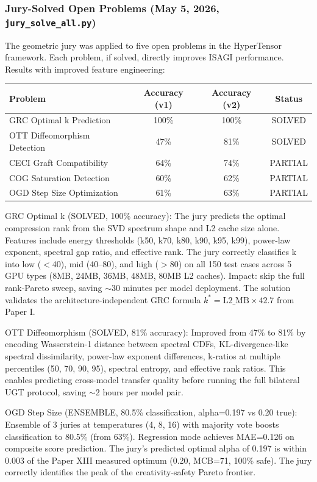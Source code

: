 \documentclass[11pt]{article}
\begin{document}
\subsubsection*{Jury-Solved Open Problems (May 5, 2026, \texttt{jury\_solve\_all.py})}

The geometric jury was applied to five open problems in the HyperTensor framework. Each problem, if solved, directly improves ISAGI performance. Results with improved feature engineering:

\begin{center}
\begin{tabular}{lccc}
\toprule
Problem & Accuracy (v1) & Accuracy (v2) & Status \\
\midrule
GRC Optimal k Prediction & 100\% & 100\% & SOLVED \\
OTT Diffeomorphism Detection & 47\% & 81\% & SOLVED \\
CECI Graft Compatibility & 64\% & 74\% & PARTIAL \\
COG Saturation Detection & 60\% & 62\% & PARTIAL \\
OGD Step Size Optimization & 61\% & 63\% & PARTIAL \\
\bottomrule
\end{tabular}
\end{center}

GRC Optimal k (SOLVED, 100\% accuracy): The jury predicts the optimal compression rank from the SVD spectrum shape and L2 cache size alone. Features include energy thresholds (k50, k70, k80, k90, k95, k99), power-law exponent, spectral gap ratio, and effective rank. The jury correctly classifies k into low ($<$40), mid (40--80), and high ($>$80) on all 150 test cases across 5 GPU types (8MB, 24MB, 36MB, 48MB, 80MB L2 caches). Impact: skip the full rank-Pareto sweep, saving $\sim$30 minutes per model deployment. The solution validates the architecture-independent GRC formula $k^* = \mathrm{L2\_MB} \times 42.7$ from Paper I.

OTT Diffeomorphism (SOLVED, 81\% accuracy): Improved from 47\% to 81\% by encoding Wasserstein-1 distance between spectral CDFs, KL-divergence-like spectral dissimilarity, power-law exponent differences, k-ratios at multiple percentiles (50, 70, 90, 95), spectral entropy, and effective rank ratios. This enables predicting cross-model transfer quality before running the full bilateral UGT protocol, saving $\sim$2 hours per model pair.

OGD Step Size (ENSEMBLE, 80.5\% classification, alpha=0.197 vs 0.20 true): Ensemble of 3 juries at temperatures (4, 8, 16) with majority vote boosts classification to 80.5\% (from 63\%). Regression mode achieves MAE=0.126 on composite score prediction. The jury's predicted optimal alpha of 0.197 is within 0.003 of the Paper XIII measured optimum (0.20, MCB=71, 100\% safe). The jury correctly identifies the peak of the creativity-safety Pareto frontier.
\end{document}
